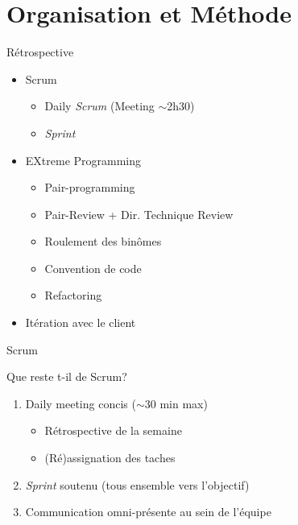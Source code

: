 \section{Organisation et Méthode}

\begin{frame}
  \begin{block}{Rétrospective}
    \begin{itemize}
      \item Scrum
        \begin{itemize}
          \item Daily \emph{Scrum} (Meeting $\sim$2h30)
          \item \emph{Sprint}
        \end{itemize}
      \item EXtreme Programming
        \begin{itemize}
          \item Pair-programming
          \item Pair-Review + Dir. Technique Review
          \item Roulement des binômes
          \item Convention de code
          \item Refactoring
        \end{itemize}
      \item Itération avec le client
   \end{itemize}
  \end{block}
\end{frame}

\begin{frame}{Scrum}
  \begin{block}{Que reste t-il de Scrum?}
    \begin{enumerate}
      \item Daily meeting concis ($\sim$30 min max)
        \begin{itemize}
          \item Rétrospective de la semaine
          \item (Ré)assignation des taches
        \end{itemize}
      \item \emph{Sprint} soutenu (tous ensemble vers l'objectif)
      \item Communication omni-présente au sein de l'équipe
    \end{enumerate}
  \end{block}
\end{frame}

